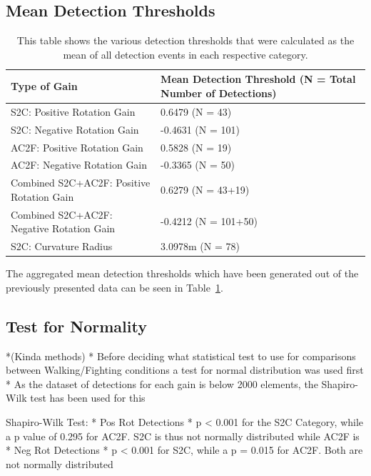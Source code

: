 \subsection{Mean Detection Thresholds}
\begin{table}[!h]
\centering
\begin{tabularx}{\textwidth}{|X|X|}
\hline
Type of Gain & Mean Detection Threshold (N = Total Number of Detections) \\
\hline
S2C: Positive Rotation Gain & 0.6479 (N = 43) \\
\hline
S2C: Negative Rotation Gain & -0.4631 (N = 101) \\
\hline
AC2F: Positive Rotation Gain & 0.5828 (N = 19) \\
\hline
AC2F: Negative Rotation Gain & -0.3365 (N = 50) \\
\hline
Combined S2C+AC2F: Positive Rotation Gain & 0.6279 (N = 43+19) \\
\hline
Combined S2C+AC2F: Negative Rotation Gain & -0.4212 (N = 101+50) \\
\hline
S2C: Curvature Radius & 3.0978m (N = 78) \\
\hline
\end{tabularx}
\caption[Experiment 1: Mean Detection Thresholds]{This table shows the various detection thresholds that were calculated as the mean of all detection events in each respective category.}
\label{table:ex1DetectionThresholds}
\end{table}

The aggregated mean detection thresholds which have been generated out of the previously presented data can be seen in Table~\ref{table:ex1DetectionThresholds}. 

\subsection{Test for Normality}
*(Kinda methods)
   * Before deciding what statistical test to use for comparisons between Walking/Fighting conditions a test for normal distribution was used first
   * As the dataset of detections for each gain is below 2000 elements, the Shapiro-Wilk test has been used for this

Shapiro-Wilk Test:
   * Pos Rot Detections
      * p < 0.001 for the S2C Category, while a p value of 0.295 for AC2F. S2C is thus not normally distributed while AC2F is
   * Neg Rot Detections
      * p < 0.001 for S2C, while a p = 0.015 for AC2F. Both are not normally distributed
      
